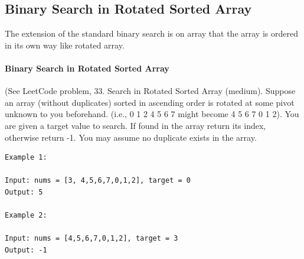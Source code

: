 \documentclass[../searching.tex]{subfiles}
\begin{document}
\subsection{Binary Search in Rotated Sorted Array}
\label{concept_binary_search_in_array}
The extension of the standard binary search is on array that the array is ordered in its own way like rotated array. 

\paragraph{Binary Search in Rotated Sorted Array } (See LeetCode problem, 33. Search in Rotated Sorted Array (medium). Suppose an array (without duplicates) sorted in ascending order is rotated at some pivot unknown to you beforehand. (i.e., 0 1 2 4 5 6 7 might become 4 5 6 7 0 1 2). You are given a target value to search. If found in the array return its index, otherwise return -1. You may assume no duplicate exists in the array.
\begin{lstlisting}[numbers=none]
Example 1:

Input: nums = [3, 4,5,6,7,0,1,2], target = 0
Output: 5

Example 2:

Input: nums = [4,5,6,7,0,1,2], target = 3
Output: -1
\end{lstlisting}
\end{document}
